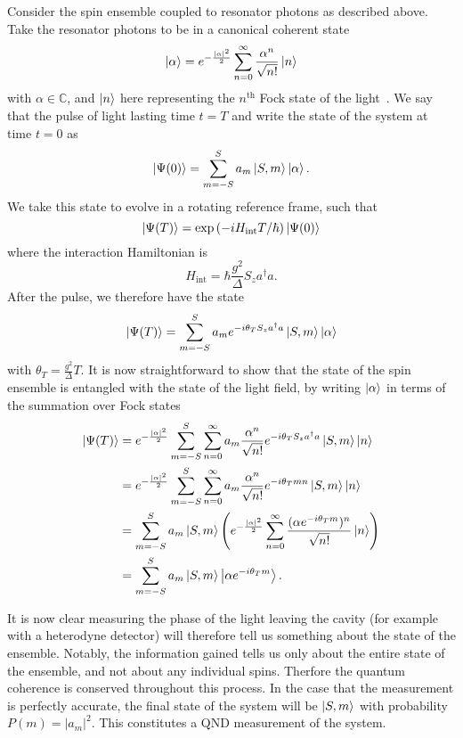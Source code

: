 \documentclass{article}
\begin{document}
Consider the spin ensemble coupled to resonator photons as described above. Take
the resonator photons to be in a canonical coherent state
%
\begin{equation}
  \ket{\alpha} = e^{-\frac{|\alpha|^2}{2}}\sum_{n=0}^\infty \frac{\alpha^n}{\sqrt{n!}} \ket{n}
\end{equation}
%
with $\alpha\in\mathbb{C}$, and $\ket{n}$ here representing the $n^\text{th}$
Fock state of the light~\cite{}. We say that the pulse of light lasting time
$t=T$ and  write the state of the system at time $t=0$ as
%
\begin{equation}
  \ket{\Psi(0)} = \sum_{m=-S}^S a_m \ket{S, m}\ket{\alpha}.
\end{equation}
%
We take this state to evolve in a rotating reference frame, such that
%
\begin{equation}
  \ket{\Psi(T)} = \exp\left(-iH_\text{int}T/\hbar\right)\ket{\Psi(0)}
\end{equation}
%
where the interaction Hamiltonian is
%
\begin{equation}
  H_\text{int} = \hbar \frac{g^2}{\Delta} S_z a^\dagger a.
\end{equation}
%
After the pulse, we therefore have the state
%
\begin{equation}
  \ket{\Psi(T)} = \sum_{m=-S}^S a_m e^{-i\theta_T S_z
  a^\dagger a} \ket{S, m}\ket{\alpha}
\end{equation}
%
with $\theta_T = \frac{g^2}{\Delta} T$. It is now straightforward to show that
the state of the spin ensemble is entangled with the state of the light field,
by writing $\ket{\alpha}$ in terms of the summation over Fock states
%
\begin{align}
  \ket{\Psi(T)} &= e^{-\frac{|\alpha|^2}{2}}\sum_{m=-S}^S \sum_{n=0}^\infty a_m
   \frac{\alpha^n}{\sqrt{n!}} e^{-i\theta_T S_z a^\dagger a} \ket{S, m} \ket{n}
   \\
  &= e^{-\frac{|\alpha|^2}{2}}\sum_{m=-S}^S \sum_{n=0}^\infty a_m
  \frac{\alpha^n}{\sqrt{n!}} e^{-i\theta_T m n} \ket{S, m} \ket{n} \\
  &= \sum_{m=-S}^S a_m \ket{S, m} \left( e^{-\frac{|\alpha|^2}{2}}
  \sum_{n=0}^\infty \frac{(\alpha e^{-i\theta_T m})^n}{\sqrt{n!}}\ket{n}\right)
  \\
  &= \sum_{m=-S}^S a_m \ket{S, m}\ket{\alpha e^{-i\theta_T m}}.
\end{align}

It is now clear measuring the phase of the light leaving the cavity
(for example with a heterodyne detector) will therefore tell us something about
the state of the ensemble. Notably, the information gained tells us only about
the entire state of the ensemble, and not about any individual spins. Therfore
the quantum coherence is conserved throughout this process.
In the case that the measurement is perfectly accurate, the final state of the
system will be $\ket{S, m}$ with probability $P(m) = |a_m|^2$. This constitutes
a QND measurement of the system. %
\end{document}
